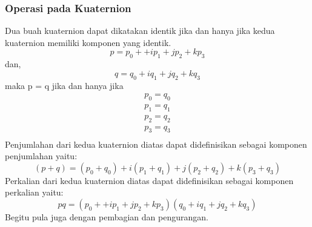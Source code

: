 \subsubsection{Operasi pada Kuaternion}
\label{sssec:operasi_pada_quaternion}
Dua buah kuaternion dapat dikatakan identik jika dan hanya jika kedua kuaternion memiliki komponen yang identik.
\[
	p = p_0 + +ip_1+jp_2+kp_3
\]
dan,
\[
	q = q_0 + i q_1 + j q_2 + k q_3
\]
maka p = q jika dan hanya jika
\begin{equation}
	\begin{split}
	p_0=q_0\\
	p_1=q_1\\
	p_2=q_2\\
	p_3=q_3\\
	\end{split}
\end{equation}
Penjumlahan dari kedua kuaternion diatas dapat didefinisikan sebagai komponen penjumlahan yaitu:
\[
	(p+q)=(p_0+q_0)+i(p_1+q_1)+j(p_2+q_2)+k(p_3+q_3)
\]
Perkalian dari kedua kuaternion diatas dapat didefinisikan sebagai komponen perkalian yaitu:
\[
	pq = (p_0 + +ip_1+jp_2+kp_3)(q_0 + i q_1 + j q_2 + k q_3)
\]
Begitu pula juga dengan pembagian dan pengurangan.